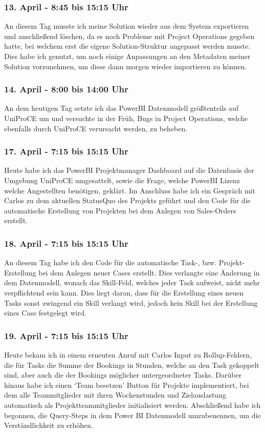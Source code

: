 \subsubsection*{13. April - 8:45 bis 15:15 Uhr}
An diesem Tag musste ich meine Solution wieder aus dem System exportieren und anschließend löschen, da es noch Probleme mit Project Operations gegeben hatte, bei welchem erst die eigene Solution-Struktur angepasst werden musste. Dies habe ich genutzt, um noch einige Anpassungen an den Metadaten meiner Solution vorzunehmen, um diese dann morgen wieder importieren zu können.

\subsubsection*{14. April - 8:00 bis 14:00 Uhr}
An dem heutigen Tag setzte ich das PowerBI Datenmodell größtenteils auf UniProCE um und versuchte in der Früh, Bugs in Project Operations, welche ebenfalls durch UniProCE verursacht werden, zu beheben.

\subsubsection*{17. April - 7:15 bis 15:15 Uhr}
Heute habe ich das PowerBI Projektmanager Dashboard auf die Datenbasis der Umgebung UniProCE umgesattelt, sowie die Frage, welche PowerBI Lizenz welche Angestellten benötigen, geklärt. Im Anschluss habe ich ein Gespräch mit Carlos zu dem aktuellen StatusQuo des Projekts geführt und den Code für die automatische Erstellung von Projekten bei dem Anlegen von Sales-Orders erstellt.

\subsubsection*{18. April - 7:15 bis 15:15 Uhr}
An diesem Tag habe ich den Code für die automatische Task-, bzw. Projekt-Erstellung bei dem Anlegen neuer Cases erstellt. Dies verlangte eine Änderung in dem Datenmodell, wonach das Skill-Feld, welches jeder Task aufweist, nicht mehr verpflichtend sein kann. Dies liegt daran, dass für die Erstellung eines neuen Tasks sonst zwingend ein Skill verlangt wird, jedoch kein Skill bei der Erstellung eines Case festgelegt wird.

\subsubsection*{19. April - 7:15 bis 15:15 Uhr}
Heute bekam ich in einem erneuten Anruf mit Carlos Input zu Rollup-Feldern, die für Tasks die Summe der Bookings in Stunden, welche an den Task gekoppelt sind, aber auch die der Bookings möglicher untergeordneter Tasks. Darüber hinaus habe ich einen \enquote*{Team besetzen} Button für Projekte implementiert, bei dem alle Teammitglieder mit ihren Wochenstunden und Zielauslastung automatisch als Projektteammitglieder initialisiert werden. Abschließend habe ich begonnen, die Query-Steps in dem Power BI Datenmodell umzubenennen, um die Verständlichkeit zu erhöhen.

